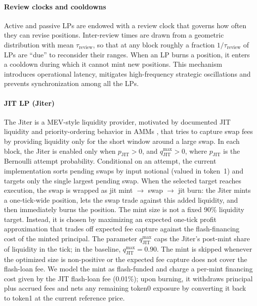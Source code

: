 \documentclass[11pt]{article}
\begin{document}
\paragraph{Review clocks and cooldowns}
Active and passive LPs are endowed with a review clock that governs how often they can revise positions.
Inter-review times are drawn from a geometric distribution with mean $\tau_{\mathrm{review}}$, so that at any
block roughly a fraction $1/\tau_{\mathrm{review}}$ of LPs are ``due'' to reconsider their ranges.
When an LP burns a position, it enters a cooldown during which it cannot mint new positions. This
mechanism introduces operational latency, mitigates high-frequency strategic oscillations and prevents
synchronization among all the LPs.

\paragraph{JIT LP (Jiter)}

The Jiter is a MEV-style liquidity provider, motivated by documented JIT liquidity and priority-ordering 
behavior in AMMs \cite{wan2022just,flashboys}, that tries to capture swap fees by providing liquidity only 
for the short window around a large swap. In each block, the Jiter is enabled only when $p_{\mathrm{JIT}}>0$, and $q^{\max}_{\mathrm{JIT}}>0$, where $p_{\mathrm{JIT}}$ is the Bernoulli attempt 
probability. Conditional on an attempt, the current implementation sorts pending swaps by input notional 
(valued in token~1) and targets only the single largest pending swap. When 
the selected target reaches execution, the swap is wrapped as jit mint $\to$ swap $\to$ jit burn: the Jiter 
mints a one-tick-wide position, lets the swap trade against this added liquidity, and then immediately burns 
the position. The mint size is not a fixed 90\% liquidity target. Instead, it is chosen by maximizing an 
expected one-tick profit approximation that trades off expected fee capture against the flash-financing cost 
of the minted principal. The parameter $q^{\max}_{\mathrm{JIT}}$ caps the Jiter's post-mint share of liquidity 
in the tick; in the baseline, $q^{\max}_{\mathrm{JIT}}=0.90$. The mint is skipped whenever the optimized size is 
non-positive or the expected fee capture does not cover the flash-loan fee. We model the mint as flash-funded and 
charge a per-mint financing cost given by the JIT flash-loan fee (0.01\%); upon burning, it withdraws principal 
plus accrued fees and nets any remaining token0 exposure by converting it back to token1 at the current reference 
price.
\end{document}
